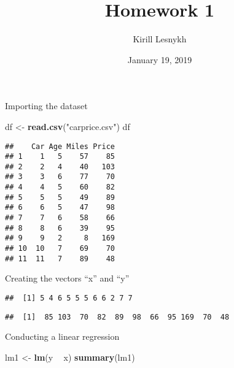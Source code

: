 \documentclass[12pt,]{article}
\title{Homework 1}
\author{Kirill Lesnykh}
\date{January 19, 2019}
\newenvironment{Shaded}{\begin{snugshade}}{\end{snugshade}}
\newcommand{\KeywordTok}[1]{\textcolor[rgb]{0.13,0.29,0.53}{\textbf{#1}}}
\newcommand{\StringTok}[1]{\textcolor[rgb]{0.31,0.60,0.02}{#1}}
\newcommand{\OperatorTok}[1]{\textcolor[rgb]{0.81,0.36,0.00}{\textbf{#1}}}
\newcommand{\NormalTok}[1]{#1}
\begin{document}
\maketitle

Importing the dataset

\begin{Shaded}
\begin{Highlighting}[]
\NormalTok{df <-}\StringTok{ }\KeywordTok{read.csv}\NormalTok{(}\StringTok{"carprice.csv"}\NormalTok{)}
\NormalTok{df}
\end{Highlighting}
\end{Shaded}

\begin{verbatim}
##    Car Age Miles Price
## 1    1   5    57    85
## 2    2   4    40   103
## 3    3   6    77    70
## 4    4   5    60    82
## 5    5   5    49    89
## 6    6   5    47    98
## 7    7   6    58    66
## 8    8   6    39    95
## 9    9   2     8   169
## 10  10   7    69    70
## 11  11   7    89    48
\end{verbatim}

Creating the vectors ``x'' and ``y''

\begin{Shaded}
\end{Shaded}

\begin{verbatim}
##  [1] 5 4 6 5 5 5 6 6 2 7 7
\end{verbatim}

\begin{Shaded}
\end{Shaded}

\begin{verbatim}
##  [1]  85 103  70  82  89  98  66  95 169  70  48
\end{verbatim}

Conducting a linear regression

\begin{Shaded}
\begin{Highlighting}[]
\NormalTok{lm1 <-}\StringTok{ }\KeywordTok{lm}\NormalTok{(y }\OperatorTok{~}\StringTok{ }\NormalTok{x)}
\KeywordTok{summary}\NormalTok{(lm1)}
\end{Highlighting}
\end{Shaded}
\end{document}
